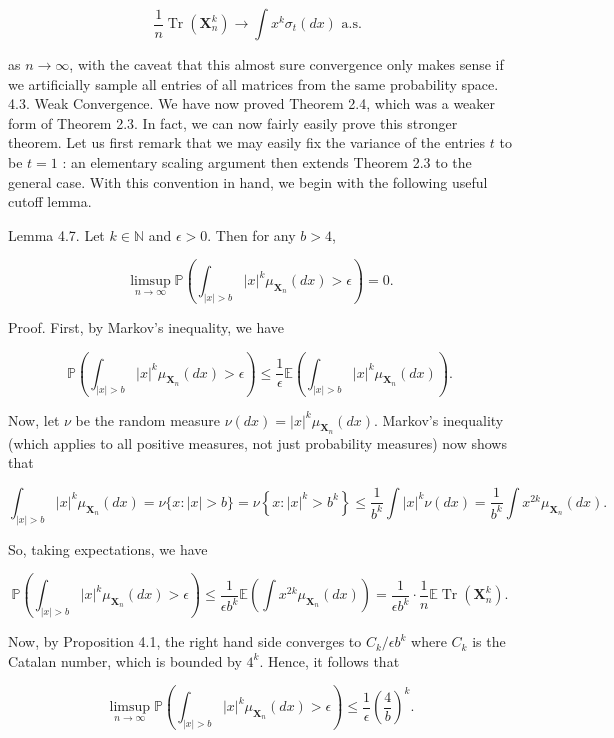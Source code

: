\documentclass[10pt]{article}
\begin{document}
$$
\frac{1}{n} \operatorname{Tr}\left(\mathbf{X}_{n}^{k}\right) \rightarrow \int x^{k} \sigma_{t}(d x) \text { a.s. }
$$

as $n \rightarrow \infty$, with the caveat that this almost sure convergence only makes sense if we artificially sample all entries of all matrices from the same probability space.\\
4.3. Weak Convergence. We have now proved Theorem 2.4, which was a weaker form of Theorem 2.3. In fact, we can now fairly easily prove this stronger theorem. Let us first remark that we may easily fix the variance of the entries $t$ to be $t=1$ : an elementary scaling argument then extends Theorem 2.3 to the general case. With this convention in hand, we begin with the following useful cutoff lemma.

Lemma 4.7. Let $k \in \mathbb{N}$ and $\epsilon>0$. Then for any $b>4$,

$$
\limsup _{n \rightarrow \infty} \mathbb{P}\left(\int_{|x|>b}|x|^{k} \mu_{\mathbf{X}_{n}}(d x)>\epsilon\right)=0 .
$$

Proof. First, by Markov's inequality, we have

$$
\mathbb{P}\left(\int_{|x|>b}|x|^{k} \mu_{\mathbf{X}_{n}}(d x)>\epsilon\right) \leq \frac{1}{\epsilon} \mathbb{E}\left(\int_{|x|>b}|x|^{k} \mu_{\mathbf{X}_{n}}(d x)\right) .
$$

Now, let $\nu$ be the random measure $\nu(d x)=|x|^{k} \mu_{\mathbf{X}_{n}}(d x)$. Markov's inequality (which applies to all positive measures, not just probability measures) now shows that

$$
\int_{|x|>b}|x|^{k} \mu_{\mathbf{X}_{n}}(d x)=\nu\{x:|x|>b\}=\nu\left\{x:|x|^{k}>b^{k}\right\} \leq \frac{1}{b^{k}} \int|x|^{k} \nu(d x)=\frac{1}{b^{k}} \int x^{2 k} \mu_{\mathbf{X}_{n}}(d x) .
$$

So, taking expectations, we have

$$
\mathbb{P}\left(\int_{|x|>b}|x|^{k} \mu_{\mathbf{X}_{n}}(d x)>\epsilon\right) \leq \frac{1}{\epsilon b^{k}} \mathbb{E}\left(\int x^{2 k} \mu_{\mathbf{X}_{n}}(d x)\right)=\frac{1}{\epsilon b^{k}} \cdot \frac{1}{n} \mathbb{E} \operatorname{Tr}\left(\mathbf{X}_{n}^{k}\right) .
$$

Now, by Proposition 4.1, the right hand side converges to $C_{k} / \epsilon b^{k}$ where $C_{k}$ is the Catalan number, which is bounded by $4^{k}$. Hence, it follows that

$$
\limsup _{n \rightarrow \infty} \mathbb{P}\left(\int_{|x|>b}|x|^{k} \mu_{\mathbf{X}_{n}}(d x)>\epsilon\right) \leq \frac{1}{\epsilon}\left(\frac{4}{b}\right)^{k} .
$$
\end{document}
